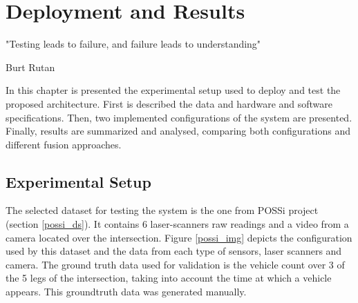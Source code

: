 \chapter [Deployment and Results]{Deployment and Results}

\epigraph{"Testing leads to failure, and failure leads to understanding"}{Burt Rutan}

In this chapter is presented the experimental setup used to deploy and test the proposed architecture. First is described the data and hardware and software specifications. Then, two implemented configurations of the system are presented. Finally, results are summarized and analysed, comparing both configurations and different fusion approaches.

\section{Experimental Setup}


The selected dataset for testing the system is the one from POSSi project (section \ref{possi_ds}). It contains 6 laser-scanners raw readings and a video from a camera located over the intersection. Figure \ref{possi_img} depicts the configuration used by this dataset and the data from each type of sensors, laser scanners and camera. The ground truth data used for validation is the vehicle count over 3 of the 5 legs of the intersection, taking into account the time at which a vehicle appears. This groundtruth data was generated manually.

